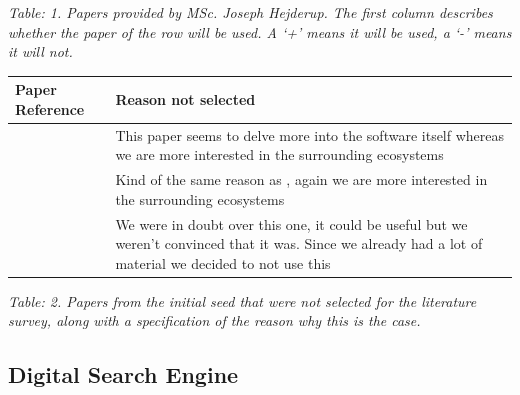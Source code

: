 \documentclass[]{book}
\begin{document}
\emph{Table: 1. Papers provided by MSc. Joseph Hejderup. The first
column describes whether the paper of the row will be used. A `+' means
it will be used, a `-' means it will not.}

\begin{longtable}[]{@{}ll@{}}
\toprule
\begin{minipage}[b]{0.05\columnwidth}\raggedright\strut
Paper Reference\strut
\end{minipage} & \begin{minipage}[b]{0.05\columnwidth}\raggedright\strut
Reason not selected\strut
\end{minipage}\tabularnewline
\midrule
\endhead
\begin{minipage}[t]{0.05\columnwidth}\raggedright\strut
\citet{Abate2009}\strut
\end{minipage} & \begin{minipage}[t]{0.05\columnwidth}\raggedright\strut
This paper seems to delve more into the software itself whereas we are
more interested in the surrounding ecosystems\strut
\end{minipage}\tabularnewline
\begin{minipage}[t]{0.05\columnwidth}\raggedright\strut
\citet{Abate2011}\strut
\end{minipage} & \begin{minipage}[t]{0.05\columnwidth}\raggedright\strut
Kind of the same reason as \citet{Abate2009}, again we are more
interested in the surrounding ecosystems\strut
\end{minipage}\tabularnewline
\begin{minipage}[t]{0.05\columnwidth}\raggedright\strut
\citet{Mens2013}\strut
\end{minipage} & \begin{minipage}[t]{0.05\columnwidth}\raggedright\strut
We were in doubt over this one, it could be useful but we weren't
convinced that it was. Since we already had a lot of material we decided
to not use this\strut
\end{minipage}\tabularnewline
\bottomrule
\end{longtable}

\emph{Table: 2. Papers from the initial seed that were not selected for
the literature survey, along with a specification of the reason why this
is the case.}

\subsection{Digital Search Engine}\label{digital-search-engine}
\end{document}
